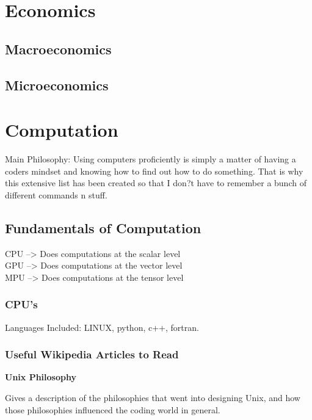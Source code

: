 \documentclass{article}
\begin{document}
\section{Economics}
\subsection{Macroeconomics}
\subsection{Microeconomics}


\section{Computation}

Main Philosophy: Using computers proficiently is simply a matter of having a coders mindset and knowing how to find out how to do something. That is why this extensive list has been created so that I don?t have to remember a bunch of different commands n stuff.

\subsection{Fundamentals of Computation}

CPU --> Does computations at the scalar level \\
GPU --> Does computations at the vector level \\
MPU --> Does computations at the tensor level \\

\subsubsection{CPU's}

Languages Included: LINUX, python, c++, fortran.

\subsubsection{Useful Wikipedia Articles to Read}

\textbf{Unix Philosophy}

Gives a description of the philosophies that went into designing Unix, and how those philosophies influenced the coding world in general. 
\end{document}
